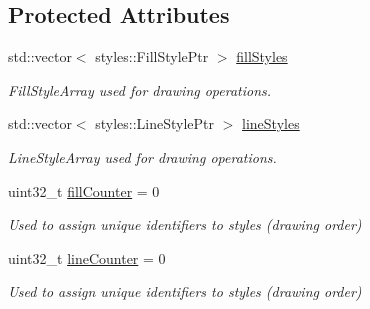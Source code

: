 \subsection*{Protected Attributes}
\begin{DoxyCompactItemize}
\item 
\hypertarget{classjswf_1_1flash_1_1tags_1_1_define_shape_tag_a26375cd02843dfa4934b67fe91f06473}{std\+::vector$<$ styles\+::\+Fill\+Style\+Ptr $>$ \hyperlink{classjswf_1_1flash_1_1tags_1_1_define_shape_tag_a26375cd02843dfa4934b67fe91f06473}{fill\+Styles}}\label{classjswf_1_1flash_1_1tags_1_1_define_shape_tag_a26375cd02843dfa4934b67fe91f06473}

\begin{DoxyCompactList}\small\item\em Fill\+Style\+Array used for drawing operations. \end{DoxyCompactList}\item 
\hypertarget{classjswf_1_1flash_1_1tags_1_1_define_shape_tag_ab92f9291fc4ca6cf99c8c496f60cd95b}{std\+::vector$<$ styles\+::\+Line\+Style\+Ptr $>$ \hyperlink{classjswf_1_1flash_1_1tags_1_1_define_shape_tag_ab92f9291fc4ca6cf99c8c496f60cd95b}{line\+Styles}}\label{classjswf_1_1flash_1_1tags_1_1_define_shape_tag_ab92f9291fc4ca6cf99c8c496f60cd95b}

\begin{DoxyCompactList}\small\item\em Line\+Style\+Array used for drawing operations. \end{DoxyCompactList}\item 
\hypertarget{classjswf_1_1flash_1_1tags_1_1_define_shape_tag_abe8923763fb918e075e19c2efa16552e}{uint32\+\_\+t \hyperlink{classjswf_1_1flash_1_1tags_1_1_define_shape_tag_abe8923763fb918e075e19c2efa16552e}{fill\+Counter} = 0}\label{classjswf_1_1flash_1_1tags_1_1_define_shape_tag_abe8923763fb918e075e19c2efa16552e}

\begin{DoxyCompactList}\small\item\em Used to assign unique identifiers to styles (drawing order) \end{DoxyCompactList}\item 
\hypertarget{classjswf_1_1flash_1_1tags_1_1_define_shape_tag_ace7ea412bf816aa58558d2009e8b0d2a}{uint32\+\_\+t \hyperlink{classjswf_1_1flash_1_1tags_1_1_define_shape_tag_ace7ea412bf816aa58558d2009e8b0d2a}{line\+Counter} = 0}\label{classjswf_1_1flash_1_1tags_1_1_define_shape_tag_ace7ea412bf816aa58558d2009e8b0d2a}

\begin{DoxyCompactList}\small\item\em Used to assign unique identifiers to styles (drawing order) \end{DoxyCompactList}\end{DoxyCompactItemize}


